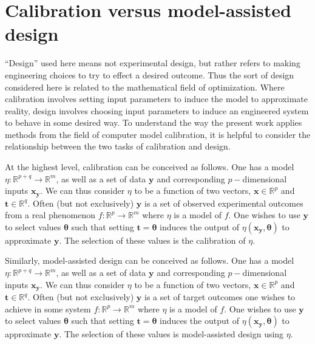 \documentclass[10pt,a4paper]{article}
\begin{document}

\section{Calibration versus model-assisted design}

``Design'' used here means not experimental design, but rather refers to making engineering choices to try to effect a desired outcome.
Thus the sort of design considered here is related to the mathematical field of optimization.
Where calibration involves setting input parameters to induce the model to approximate reality, design involves choosing input parameters to induce an engineered system to behave in some desired way.
To understand the way the present work applies methods from the field of computer model calibration, it is helpful to consider the relationship between the two tasks of calibration and design.

At the highest level, calibration can be conceived as follows.
One has a model $\eta: \mathbb{R}^{p+q} \to \mathbb{R}^m$, as well as a set of data $\mathbf{y}$ and corresponding $p-$dimensional inputs $\mathbf{x_y}$.
We can thus consider $\eta$ to be a function of two vectors, $\mathbf x\in\mathbb R^p$ and $\mathbf t\in\mathbb R^q$.
Often (but not exclusively) $\mathbf y$ is a set of observed experimental outcomes from a real phenomenon $f:\mathbb{R}^p\to\mathbb{R}^m$ where $\eta$ is a model of $f$.
One wishes to use $\mathbf y$ to select values $\boldsymbol{\theta}$ such that setting $\mathbf t=\boldsymbol{\theta}$ induces the output of $\eta(\mathbf {x_y},\boldsymbol{\theta})$ to approximate $\mathbf y$.
The selection of these values is the calibration of $\eta$.

Similarly, model-assisted design can be conceived as follows.
One has a model $\eta: \mathbb{R}^{p+q} \to \mathbb{R}^m$, as well as a set of data $\mathbf{y}$ and corresponding $p-$dimensional inputs $\mathbf{x_y}$.
We can thus consider $\eta$ to be a function of two vectors, $\mathbf x\in\mathbb R^p$ and $\mathbf t\in\mathbb R^q$.
Often (but not exclusively) $\mathbf y$ is a set of target outcomes one wishes to achieve in some system $f:\mathbb{R}^p\to\mathbb{R}^m$ where $\eta$ is a model of $f$.
One wishes to use $\mathbf y$ to select values $\boldsymbol{\theta}$ such that setting $\mathbf t=\boldsymbol{\theta}$ induces the output of $\eta(\mathbf {x_y},\boldsymbol{\theta})$ to approximate $\mathbf y$.
The selection of these values is model-assisted design using $\eta$.
\end{document}
